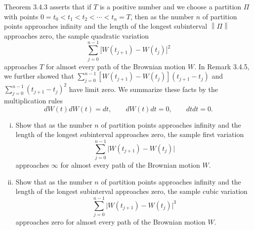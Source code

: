 \documentclass[11pt]{article}
\newcommand\norm[1]{\left\lVert#1\right\rVert}
\newcounter{question}[section]
\begin{document}
    \begin{hwquestion}
        Theorem 3.4.3 asserts that if $T$ is a positive number and we choose a partition
        $\Pi$ with points $0 = t_0 < t_1 < t_2 < \cdots < t_n = T$, then as the number $n$
        of partition points approaches infinity and the length of the longest subinterval
        $\norm{\Pi}$ approaches zero, the sample quadratic variation
        \[
            \sum_{j=0}^{n-1}
            \big[
                W(t_{j+1}) - W(t_{j})
            \big]^2
        \]
        approaches $T$ for almost every path of the Brownian motion $W$. In Remark 3.4.5,
        we further showed that $\sum_{j=0}^{n-1} [W(t_{j+1}) - W(t_{j})] (t_{j+1}-t_{j})$
        and $\sum_{j=0}^{n-1} (t_{j+1}-t_{j})^2$ have limit zero. We summarize these facts
        by the multiplication rules
        \[
            dW(t) dW(t) = dt,
            \qquad
            dW(t) dt = 0,
            \qquad
            dt dt = 0.
        \]

        \begin{enumerate}[(i), nolistsep]
            \item Show that as the number $n$ of partition points approaches infinity and
            the length of the longest subinterval approaches zero, the sample first
            variation
            \[
                \sum_{j=0}^{n-1}
                \big|
                    W(t_{j+1}) - W(t_{j})
                \big|
            \]
            approaches $\infty$ for almost every path of the Brownian motion $W$.
            \item Show that as the number $n$ of partition points approaches infinity and
            the length of the longest subinterval approaches zero, the sample cubic
            variation
            \[
                \sum_{j=0}^{n-1}
                \big|
                    W(t_{j+1}) - W(t_{j})
                \big|^3
            \]
            approaches zero for almost every path of the Brownian motion $W$.
        \end{enumerate}
    \end{hwquestion}
\end{document}
